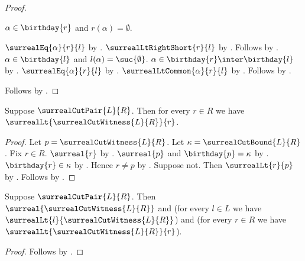 \begin{proof}
\begin{subproof}
\begin{byCase}
                $\alpha\in\birthday{r}$ and
                    $r(\alpha)=\emptyset$.
                \begin{byCase}
                        $\surrealEq{\alpha}{r}{l}$
                            by .
                        $\surrealLtRightShort{r}{l}$
                            by .
                        Follows by .
                        $\alpha\in\birthday{l}$ and
                            $l(\alpha)=\suc{\emptyset}$.
                        $\alpha\in\birthday{r}\inter\birthday{l}$
                            by .
                        $\surrealEq{\alpha}{r}{l}$
                            by .
                        $\surrealLtCommon{\alpha}{r}{l}$
                            by .
                        Follows by .
                \end{byCase}
        \end{byCase}
    \end{subproof}
    Follows by .
\end{proof}

\begin{theorem}\label{surreal_cut_witness_right}
    Suppose $\surrealCutPair{L}{R}$.
    Then for every $r\in R$ we have
        $\surrealLt{\surrealCutWitness{L}{R}}{r}$.
\end{theorem}
\begin{proof}
    Let $p=\surrealCutWitness{L}{R}$.
    Let $\kappa=\surrealCutBound{L}{R}$.
    Fix $r\in R$.
    $\surreal{r}$ by .
    $\surreal{p}$ and $\birthday{p}=\kappa$
        by .
    $\birthday{r}\in\kappa$
        by .
    Hence $r\neq p$ by .
    Suppose not.
    Then $\surrealLt{r}{p}$
        by .
    Follows by .
\end{proof}

\begin{theorem}\label{surreal_cut_witness_between}
    Suppose $\surrealCutPair{L}{R}$.
    Then $\surreal{\surrealCutWitness{L}{R}}$ and
        (for every $l\in L$ we have
            $\surrealLt{l}{\surrealCutWitness{L}{R}}$) and
        (for every $r\in R$ we have
            $\surrealLt{\surrealCutWitness{L}{R}}{r}$).
\end{theorem}
\begin{proof}
    Follows by .
\end{proof}

